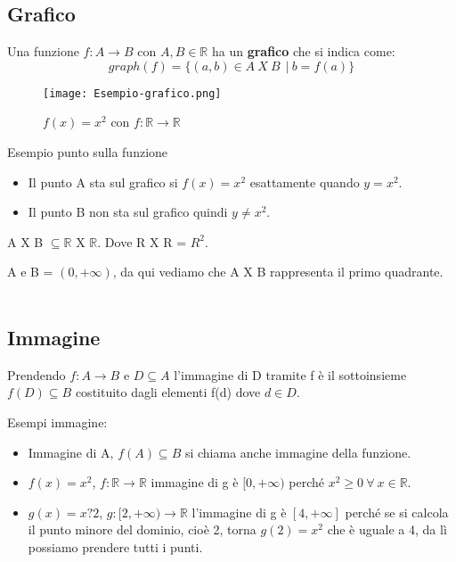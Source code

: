 \subsection{Grafico}
Una funzione $f: A \longrightarrow B$ con $A,B \in \mathbb{R}$ ha un \textbf{grafico} che si indica come:
\begin{equation}
    graph(f) = \{(a,b) \in A \:X\: B\ \:|\: b = f(a)\}
\end{equation}
\begin{wrapfigure}[8]{l}{7cm}
    \centering
    \texttt{[image: Esempio-grafico.png]}
    \caption{$f(x) = x^2$ con $f: \mathbb{R} \longrightarrow \mathbb{R}$}
    \label{fig:esempio-grafico}
\end{wrapfigure}
\begin{example}
Esempio punto sulla funzione
\begin{itemize}
    \item Il punto A sta sul grafico si $f(x) = x^2$ esattamente quando $y = x^2$.
    \item Il punto B non sta sul grafico quindi $y \neq x^2$.
\end{itemize}
\end{example}
\begin{note}
    A X B $\subseteq \mathbb{R}$ X $\mathbb{R}$. Dove R X R = $R^2$.
\end{note}
\begin{example}
A e B = $(0, +\infty)$, da qui vediamo che A X B rappresenta il primo quadrante.\\\\
\end{example}

\subsection{Immagine}
\begin{definition}[Immagine]
Prendendo $f: A \longrightarrow B$ e $D \subseteq A$ l'immagine di D tramite f è il sottoinsieme $f(D) \subseteq B$ costituito dagli elementi f(d) dove $d \in D$.
\end{definition}
\begin{example}
    Esempi immagine:
    \begin{itemize}
        \item Immagine di A, $f(A) \subseteq B$ si chiama anche immagine della funzione.
        \item $f(x) = x^2$, $f: \mathbb{R} \longrightarrow \mathbb{R}$ \hspace{.2cm} immagine di g è $[0, +\infty)$ perché $x^2 \geq 0 \: \forall \: x \in \mathbb{R}$.
        \item $g(x) = x?2$, $g:[2, +\infty) \longrightarrow \mathbb{R}$ \hspace{.2cm} l'immagine di g è $[4, +\infty]$ perché se si calcola il punto minore del dominio, cioè 2, torna $g(2) = x^2$ che è uguale a 4, da lì possiamo prendere tutti i punti.
    \end{itemize}
\end{example}

